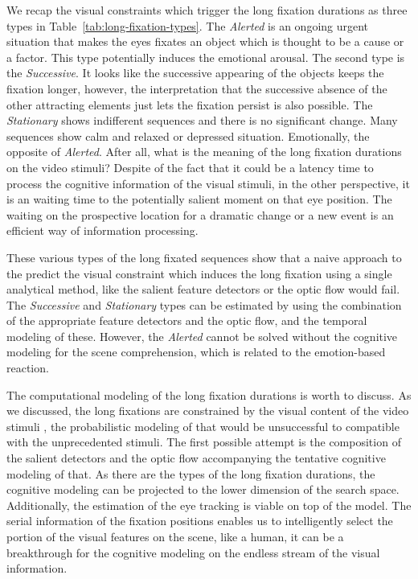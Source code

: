 \documentclass[10pt,letterpaper]{article}
\begin{document}
We recap the visual constraints which trigger the long fixation durations as three types in Table~\ref{tab:long-fixation-types}. The \textit{Alerted} is an ongoing urgent situation that makes the eyes fixates an object which is thought to be a cause or a factor. This type potentially induces the emotional arousal. The second type is the \textit{Successive}. It looks like the successive appearing of the objects keeps the fixation longer, however, the interpretation that the successive absence of the other attracting elements just lets the fixation persist is also possible. The \textit{Stationary} shows indifferent sequences and there is no significant change. Many sequences show calm and relaxed or depressed situation. Emotionally, the opposite of \textit{Alerted}. After all, what is the meaning of the long fixation durations on the video stimuli? Despite of the fact that it could be a latency time to process the cognitive information of the visual stimuli, in the other perspective, it is an waiting time to the potentially salient moment on that eye position. The waiting on the prospective location for a dramatic change or a new event is an efficient way of information processing.

These various types of the long fixated sequences show that a naive approach to the predict the visual constraint which induces the long fixation using a single analytical method, like the salient feature detectors \cite{marr1980,canny1986} or the optic flow \cite{koenderink1986} would fail. The \textit{Successive} and \textit{Stationary} types can be estimated by using the combination of the appropriate feature detectors and the optic flow, and the temporal modeling of these. However, the \textit{Alerted} cannot be solved without the cognitive modeling for the scene comprehension, which is related to the emotion-based reaction. 

The computational modeling of the long fixation durations is worth to discuss. As we discussed, the long fixations are constrained by the visual content of the video stimuli \cite{zhang2013}, the probabilistic modeling of that would be unsuccessful to compatible with the unprecedented stimuli. The first possible attempt is the composition of the salient detectors \cite{marr1980,canny1986} and the optic flow \cite{koenderink1986} accompanying the tentative cognitive modeling of that. As there are the types of the long fixation durations, the cognitive modeling can be projected to the lower dimension of the search space. Additionally, the estimation of the eye tracking is viable on top of the model. The serial information of the fixation positions enables us to intelligently select the portion of the visual features on the scene, like a human, it can be a breakthrough for the cognitive modeling on the endless stream of the visual information.
\end{document}

